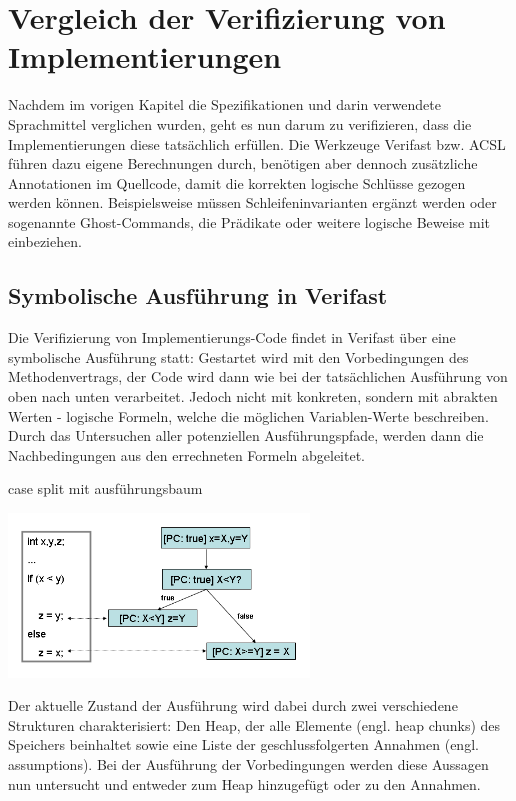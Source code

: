 ﻿\chapter{Vergleich der Verifizierung von Implementierungen}

Nachdem im vorigen Kapitel die Spezifikationen und darin verwendete Sprachmittel verglichen wurden,
geht es nun darum zu verifizieren, dass die Implementierungen diese tatsächlich erfüllen.
Die Werkzeuge Verifast bzw. ACSL führen dazu eigene Berechnungen durch, benötigen aber dennoch
zusätzliche Annotationen im Quellcode, damit die korrekten logische Schlüsse gezogen 
werden können. Beispielsweise müssen Schleifeninvarianten ergänzt werden oder sogenannte
Ghost-Commands, die Prädikate oder weitere logische Beweise mit einbeziehen.

\section{Symbolische Ausführung in Verifast}

Die Verifizierung von Implementierungs-Code findet in Verifast über eine symbolische Ausführung statt:
Gestartet wird mit den Vorbedingungen des Methodenvertrags, der Code wird dann wie bei der tatsächlichen
Ausführung von oben nach unten verarbeitet. Jedoch nicht mit konkreten, sondern mit 
abrakten Werten - logische Formeln, welche die möglichen Variablen-Werte beschreiben. Durch das 
Untersuchen aller potenziellen Ausführungspfade, werden dann die Nachbedingungen aus den 
errechneten Formeln abgeleitet. 


case split mit ausführungsbaum 


\begin{center}
\includegraphics[width=0.6\textwidth]{images/symbolic_execution.png}
\end{center}

Der aktuelle Zustand der Ausführung wird dabei durch zwei verschiedene Strukturen charakterisiert: 
Den Heap, der alle Elemente (engl. heap chunks) des Speichers beinhaltet sowie eine Liste
der geschlussfolgerten Annahmen (engl. assumptions). Bei der Ausführung der Vorbedingungen werden
diese Aussagen nun untersucht und entweder zum Heap hinzugefügt oder zu den Annahmen.

